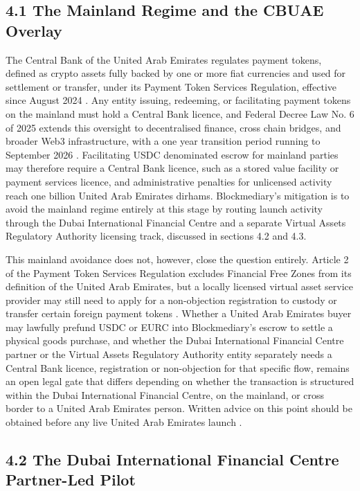 \documentclass[12pt, a4paper]{article}
\begin{document}
\subsection*{4.1 The Mainland Regime and the CBUAE Overlay}

The Central Bank of the United Arab Emirates regulates payment tokens, defined as crypto
assets fully backed by one or more fiat currencies and used for settlement or transfer,
under its Payment Token Services Regulation, effective since August 2024
\citep{cbuaeptsr2024}. Any entity issuing, redeeming, or facilitating payment tokens on
the mainland must hold a Central Bank licence, and Federal Decree Law No. 6 of 2025
extends this oversight to decentralised finance, cross chain bridges, and broader Web3
infrastructure, with a one year transition period running to September 2026
\citep{uaefdl62025}. Facilitating USDC denominated escrow for mainland parties may
therefore require a Central Bank licence, such as a stored value facility or payment
services licence, and administrative penalties for unlicensed activity reach one billion
United Arab Emirates dirhams. Blockmediary's mitigation is to avoid the mainland regime
entirely at this stage by routing launch activity through the Dubai International
Financial Centre and a separate Virtual Assets Regulatory Authority licensing track,
discussed in sections 4.2 and 4.3.

This mainland avoidance does not, however, close the question entirely. Article 2 of the
Payment Token Services Regulation excludes Financial Free Zones from its definition of the
United Arab Emirates, but a locally licensed virtual asset service provider may still need
to apply for a non-objection registration to custody or transfer certain foreign payment
tokens \citep{cbuaeptsrarticle2}. Whether a United Arab Emirates buyer may lawfully prefund
USDC or EURC into Blockmediary's escrow to settle a physical goods purchase, and whether
the Dubai International Financial Centre partner or the Virtual Assets Regulatory
Authority entity separately needs a Central Bank licence, registration or non-objection
for that specific flow, remains an open legal gate that differs depending on whether the
transaction is structured within the Dubai International Financial Centre, on the
mainland, or cross border to a United Arab Emirates person. Written advice on this point
should be obtained before any live United Arab Emirates launch \citep{difcvarareport2026}.

\subsection*{4.2 The Dubai International Financial Centre Partner-Led Pilot}
\end{document}
